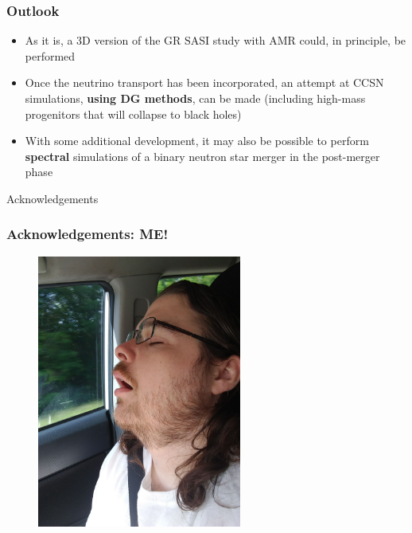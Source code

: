 \documentclass{beamer}
\begin{document}
\begin{frame}
\frametitle{Outlook}

\begin{itemize}
  \item
    As it is, a 3D version of the GR SASI study with AMR could, in principle,
    be performed
  \item
    Once the neutrino transport has been incorporated,
    an attempt at CCSN simulations, \textbf{using DG methods}, can be made
    (including high-mass progenitors that will collapse to black holes)
  \item
    With some additional development,
    it may also be possible to perform \textbf{spectral}
    simulations of a binary neutron star merger in the post-merger phase
\end{itemize}

\end{frame}

\begin{frame}

  \begin{center}
    {\Large Acknowledgements}
  \end{center}

\end{frame}

\begin{frame}
\frametitle{Acknowledgements: ME!}

  \begin{figure}[htb!]
    \centering
    \includegraphics[width=0.6\textwidth,angle=-90]{headshot.jpeg}
  \end{figure}

\end{frame}
\end{document}
